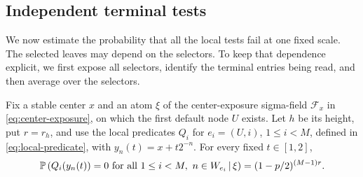 \subsection{Independent terminal tests}

We now estimate the probability that all the local tests fail at one
fixed scale.  The selected leaves may depend on the selectors.  To keep
that dependence explicit, we first expose all selectors, identify the
terminal entries being read, and then average over the selectors.

\begin{lemma}
\label{lem:fixed-scale}
Fix a stable center \(x\) and an atom \(\xi\) of the center-exposure
sigma-field \(\mathcal F_x\) in \eqref{eq:center-exposure}, on
which the first default node \(U\) exists.  Let \(h\) be its height,
put \(r=r_h\), and use the local predicates \(Q_i\) for
\(e_i=(U,i)\), \(1\le i<M\), defined in \eqref{eq:local-predicate}, with \(y_n(t)=x+t2^{-n}\). For every fixed
\(t\in[1,2]\),
\begin{equation}
 \mathbb P\left(
 Q_i(y_n(t))=0
 \text{ for all }1\le i<M,\ n\in W_{e_i}
 \,\middle|\,\xi
 \right)
 =(1-p/2)^{(M-1)r}.
 \label{eq:fixed-scale-miss}
\end{equation}
\end{lemma}

